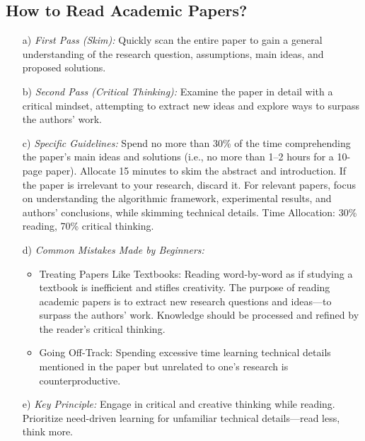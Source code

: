 \documentclass[conference]{IEEEtran}
\begin{document}
\subsection{How to Read Academic Papers?}\label{BB}
\begin{enumerate}
\item [a)] \textit{First Pass (Skim):} Quickly scan the entire paper to gain a general understanding of the research question, assumptions, main ideas, and proposed solutions.

\item [b)] \textit{Second Pass (Critical Thinking):} Examine the paper in detail with a critical mindset, attempting to extract new ideas and explore ways to surpass the authors' work.
\item [c)] \textit{Specific Guidelines:} Spend no more than 30\% of the time comprehending the paper’s main ideas and solutions (i.e., no more than 1–2 hours for a 10-page paper). Allocate 15 minutes to skim the abstract and introduction. If the paper is irrelevant to your research, discard it. For relevant papers, focus on understanding the algorithmic framework, experimental results, and authors' conclusions, while skimming technical details. Time Allocation: 30\% reading, 70\% critical thinking.
\item [d)]  \textit{Common Mistakes Made by Beginners:}
\begin{itemize}
\item Treating Papers Like Textbooks: Reading word-by-word as if studying a textbook is inefficient and stifles creativity. The purpose of reading academic papers is to extract new research questions and ideas—to surpass the authors’ work. Knowledge should be processed and refined by the reader’s critical thinking.
\item Going Off-Track: Spending excessive time learning technical details mentioned in the paper but unrelated to one’s research is counterproductive.
\end{itemize}
\item [e)]  \textit{Key Principle:} Engage in critical and creative thinking while reading. Prioritize need-driven learning for unfamiliar technical details—read less, think more.
\end{enumerate}
\end{document}
